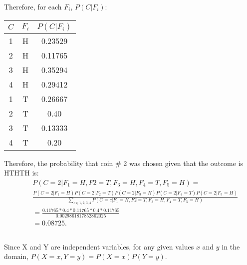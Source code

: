 \documentclass{homework}
\begin{document}
Therefore, for each $F_i$, $P(C | F_i)$:

\begin{table}[h!]
    \centering
    \begin{tabular}{cc|c}
        $C$ & $F_i$ & $P(C | F_i)$  \\
        \midrule
        1 & H & 0.23529 \\
        2 & H & 0.11765 \\
        3 & H & 0.35294 \\
        4 & H & 0.29412 \\
        1 & T & 0.26667 \\
        2 & T & 0.40 \\
        3 & T & 0.13333 \\
        4 & T & 0.20 \\
    \end{tabular}
\end{table}

Therefore, the probability that coin \# 2 was chosen given that the outcome is HTHTH is:
\begin{align*}
    & & P(C = 2 | F_1=H,F2=T,F_3=H,F_4=T,F_5=H) = \\
    && \frac{P(C = 2 | F_1=H) P(C = 2 | F_2=T) P(C = 2 | F_3=H) P(C = 2 | F_4=T) P(C = 2 | F_5=H)}{\sum\limits_{c \in {1,2,3,4}}{P(C = c | F_1=H,F2=T,F_3=H,F_4=T,F_5=H)}}\\
    &&= \frac{0.11765 * 0.4 * 0.11765 * 0.4 * 0.11765}{0.0029861817852862025}\\
    &&= 0.08725 .
\end{align*}

\clearpage
\subsection{}
Since X and Y are independent variables, for any given values $x$ and $y$ in the domain, $P(X=x, Y=y) = P(X=x) P(Y=y)$. 





\end{document}
